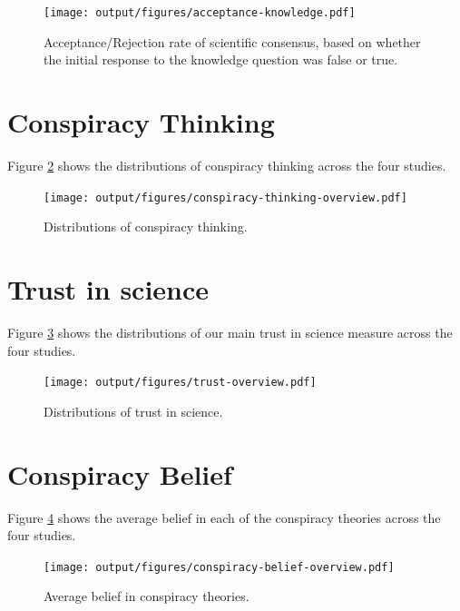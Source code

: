 \documentclass[
  doc,floatsintext]{apa6}
\begin{document}
\begin{figure}
\centering
\texttt{[image: output/figures/acceptance-knowledge.pdf]}
\caption{\label{fig:acceptance-knowledge}Acceptance/Rejection rate of scientific consensus, based on whether the initial response to the knowledge question was false or true.}
\end{figure}

\clearpage

\section{Conspiracy Thinking}\label{conspiracy-thinking}

Figure \ref{fig:conspiracy-thinking-overview} shows the distributions of conspiracy thinking across the four studies.



\begin{figure}
\centering
\texttt{[image: output/figures/conspiracy-thinking-overview.pdf]}
\caption{\label{fig:conspiracy-thinking-overview}Distributions of conspiracy thinking.}
\end{figure}

\clearpage

\section{Trust in science}\label{trust}

Figure \ref{fig:trust-overview} shows the distributions of our main trust in science measure across the four studies.



\begin{figure}
\centering
\texttt{[image: output/figures/trust-overview.pdf]}
\caption{\label{fig:trust-overview}Distributions of trust in science.}
\end{figure}

\clearpage

\section{Conspiracy Belief}\label{conspiracy-belief}

Figure \ref{fig:conspiracy-belief-overview} shows the average belief in each of the conspiracy theories across the four studies.



\begin{figure}
\centering
\texttt{[image: output/figures/conspiracy-belief-overview.pdf]}
\caption{\label{fig:conspiracy-belief-overview}Average belief in conspiracy theories.}
\end{figure}
\end{document}
